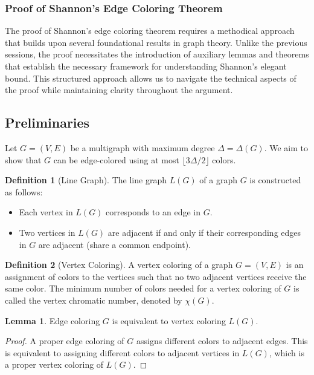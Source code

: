\documentclass{article}
\theoremstyle{definition}
\newtheorem{lemma}{Lemma}
\newtheorem{definition}{Definition}
\begin{document}
\subsubsection{Proof of Shannon's Edge Coloring Theorem}
The proof of Shannon's edge coloring theorem requires a methodical approach that builds upon several foundational results in graph theory. Unlike the previous sessions, the proof necessitates the introduction of auxiliary lemmas and theorems that establish the necessary framework for understanding Shannon's elegant bound. This structured approach allows us to navigate the technical aspects of the proof while maintaining clarity throughout the argument.

\subsection* {Preliminaries}
Let $G = (V, E)$ be a multigraph with maximum degree $\Delta = \Delta(G)$. We aim to show that $G$ can be edge-colored using at most $\lfloor 3\Delta/2 \rfloor$ colors.

\begin{definition}[Line Graph]
The line graph $L(G)$ of a graph $G$ is constructed as follows:
\begin{itemize}
    \item Each vertex in $L(G)$ corresponds to an edge in $G$.
    \item Two vertices in $L(G)$ are adjacent if and only if their corresponding edges in $G$ are adjacent (share a common endpoint).
\end{itemize}
\end{definition}

\begin{definition}[Vertex Coloring]
A vertex coloring of a graph $G = (V, E)$ is an assignment of colors to the vertices such that no two adjacent vertices receive the same color. The minimum number of colors needed for a vertex coloring of $G$ is called the vertex chromatic number, denoted by $\chi(G)$.
\end{definition}

\begin{lemma}
Edge coloring $G$ is equivalent to vertex coloring $L(G)$.
\end{lemma}


\begin{proof}
A proper edge coloring of $G$ assigns different colors to adjacent edges. This is equivalent to assigning different colors to adjacent vertices in $L(G)$, which is a proper vertex coloring of $L(G)$.
\end{proof}
\end{document}
